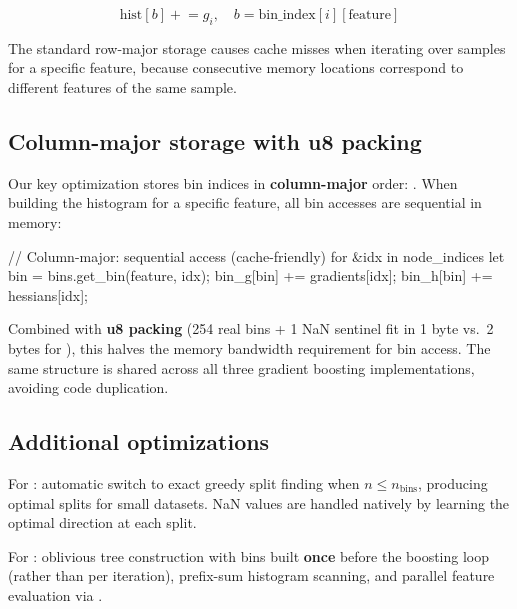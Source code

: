 \documentclass[article]{jss}
\begin{document}
\begin{equation} \label{eq:histogram}
\text{hist}[b] \mathrel{+}= g_i, \quad b = \text{bin\_index}[i][\text{feature}]
\end{equation}

The standard row-major storage  causes cache
misses when iterating over samples for a specific feature, because consecutive
memory locations correspond to different features of the same sample.

\subsection{Column-major storage with u8 packing}

{\sloppy
Our key optimization stores bin indices in \textbf{column-major} order:
. When building the histogram for a specific
feature, all bin accesses are sequential in memory:\par}

\begin{CodeChunk}
\begin{CodeInput}
// Column-major: sequential access (cache-friendly)
for &idx in node_indices {
    let bin = bins.get_bin(feature, idx);
    bin_g[bin] += gradients[idx];
    bin_h[bin] += hessians[idx];
}
\end{CodeInput}
\end{CodeChunk}

Combined with \textbf{u8 packing} (254 real bins + 1 NaN sentinel fit in 1 byte
vs.\ 2 bytes for ), this halves the memory bandwidth requirement for bin
access. The same  structure is shared across all three gradient
boosting implementations, avoiding code duplication.

\subsection{Additional optimizations}

For : automatic switch to exact greedy split finding when
$n \leq n_{\text{bins}}$, producing optimal splits for small datasets. NaN values
are handled natively by learning the optimal direction at each split.

For : oblivious tree construction with bins built \textbf{once}
before the boosting loop (rather than per iteration), prefix-sum histogram
scanning, and parallel feature evaluation via .
\end{document}
